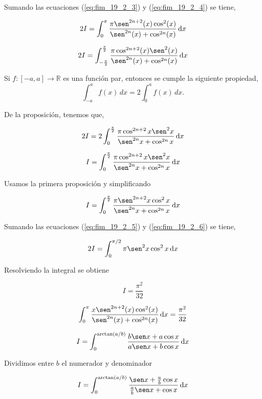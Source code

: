 {Sumando las ecuaciones (\ref{eq:fim_19_2_3}) y  (\ref{eq:fim_19_2_4}) se tiene,

$$
2I=  \int_{0}^{\pi} \frac{\pi \sen^{2n+2}(x) \cos^2 (x) }{  \sen^{2n}(x) +\cos^{2n}(x)} \dd{x}
$$

$$
2I= \int_{-\frac{\pi}{2}}^{\frac{\pi}{2}} \frac{\pi \cos^{2n+2}(x) \sen^2(x)}{\sen^{2n}(x)+\cos^{2n}(x)} \dd{x}
$$
\begin{proposicion}
	Si \( f: [-a,a] \to \mathbb{R} \) es una función par,  entonces se cumple la siguiente propiedad,
	\[
	\int_{-a}^{a} f(x) \,dx = 2 \int_{0}^{a} f(x) \,dx.
	\]
\end{proposicion}

De la proposición, tenemos que,

$$
 2I=   2\int_{0}^{\frac{\pi}{2}} \frac{\pi \cos^{2n+2}x \sen^2 x }{  \sen^{2n}x +\cos^{2n}x} \dd{x}
$$

\begin{equation}
	I=  \int_{0}^{\frac{\pi}{2}} \frac{\pi \cos^{2n+2}x \sen^2 x }{  \sen^{2n}x +\cos^{2n}x} \dd{x}
	\label{eq:fim_19_2_5}
\end{equation}

Usamos la primera proposición y simplificando


\begin{equation}
	I=  \int_{0}^{\frac{\pi}{2}} \frac{\pi \sen^{2n+2}x \cos^2 x }{  \sen^{2n}x +\cos^{2n}x} \dd{x
	}
	\label{eq:fim_19_2_6}
\end{equation}

Sumando las ecuaciones (\ref{eq:fim_19_2_5}) y  (\ref{eq:fim_19_2_6}) se tiene,

$$
2I=  \int_{0}^{\pi/2} \pi \sen^2 x \cos^2 x  \dd{x}  
$$

Resolviendo la integral se obtiene

$$
I=\frac{\pi^2}{32}
$$
 
\begin{LnxRptaBox}
	$$
 \int_{0}^{\pi} \frac{x \sen^{2n+2}(x) \cos^2 (x) }{  \sen^{2n}(x) +\cos^{2n}(x)} \dd{x}= \frac{\pi^2}{32}
	$$
\end{LnxRptaBox}



$$
I= \int_{0}^{ \arctan(a/b) } \frac{b\sen x +a\cos x}{a\sen x+b\cos x} 
\dd{x}
$$

Dividimos entre $b$ el numerador y denominador

$$
I = \int_{0}^{ \arctan(a/b) } \frac{\sen x +\frac{a}{b}\cos x}{\frac{a}{b} \sen x+\cos x} \dd{x}   
$$

}
